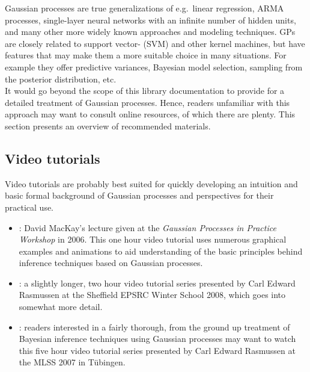 \documentclass[10pt]{report}
\begin{document}
Gaussian processes are true generalizations of e.g.\ linear regression, ARMA
processes, single-layer neural networks with an infinite number of hidden units,
and many other more widely known approaches and modeling techniques.  GPs are
closely related to support vector- (SVM) and other kernel machines, but have
features that may make them a more suitable choice in many situations.  For
example they offer predictive variances, Bayesian model selection, sampling from
the posterior distribution, etc.\\

It would go beyond the scope of this library documentation to provide for a
detailed treatment of Gaussian processes.  Hence, readers unfamiliar with this
approach may want to consult online resources, of which there are plenty.  This
section presents an overview of recommended materials.

\subsection{Video tutorials}

Video tutorials are probably best suited for quickly developing an intuition and
basic formal background of Gaussian processes and perspectives for their
practical use.

\begin{itemize}

\item \emph{}: David MacKay's lecture given at the \emph{Gaussian Processes
in Practice Workshop} in 2006.  This one hour video tutorial uses numerous
graphical examples and animations to aid understanding of the basic principles
behind inference techniques based on Gaussian processes.

\item
\emph{}: a slightly longer, two hour video tutorial series
presented by Carl Edward Rasmussen at the Sheffield EPSRC Winter School 2008,
which goes into somewhat more detail.

\item
\emph{}: readers interested in a fairly thorough,
from the ground up treatment of Bayesian inference techniques using Gaussian
processes may want to watch this five hour video tutorial series presented by
Carl Edward Rasmussen at the MLSS 2007 in T\"ubingen.

\end{itemize}
\end{document}
